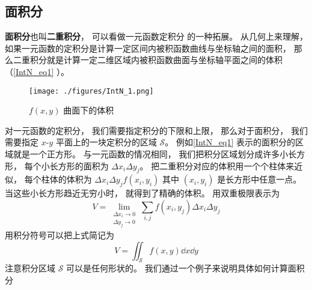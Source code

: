 
\begin{issues}
\issueTODO
\end{issues}

\subsection{面积分}
\textbf{面积分}也叫\textbf{二重积分}， 可以看做一元函数定积分 的一种拓展。 从几何上来理解， 如果一元函数的定积分是计算一定区间内被积函数曲线与坐标轴之间的面积， 那么二重积分就是计算一定二维区域内被积函数曲面与坐标轴平面之间的体积（\autoref{IntN_eq1} ）。

\begin{figure}[ht]
\centering
\texttt{[image: ./figures/IntN\_1.png]}
\caption{$f(x, y)$ 曲面下的体积} \label{IntN_fig1}
\end{figure}

对一元函数的定积分， 我们需要指定积分的下限和上限， 那么对于面积分， 我们需要指定 $x$-$y$ 平面上的一块定积分的区域 $\mathcal S$。 例如\autoref{IntN_eq1} 表示的面积分的区域就是一个正方形。 与一元函数的情况相同， 我们把积分区域划分成许多小长方形， 每个小长方形的面积为 $\Delta x_i \Delta y_j$。 把二重积分对应的体积用一个个柱体来近似， 每个柱体的体积为 $\Delta x_i \Delta y_j f(x_i, y_i)$ 其中 $(x_i, y_i)$ 是长方形中任意一点。 当这些小长方形趋近无穷小时， 就得到了精确的体积。 用双重极限表示为 %
\begin{equation}\label{IntN_eq1}
V = \lim_{\substack{\Delta x_i\to 0\\ \Delta y_j\to 0}} \sum_{i, j} f(x_i,y_j) \Delta x_i \Delta y_j
\end{equation}
用积分符号可以把上式简记为
\begin{equation}
V = \iint_{\mathcal{S}} f(x,y) \dd{x}\dd{y}
\end{equation}
注意积分区域 $\mathcal S$ 可以是任何形状的。 我们通过一个例子来说明具体如何计算面积分

